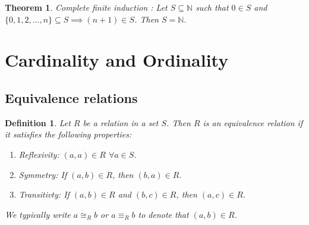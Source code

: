 \documentclass[a4paper]{article}
\newtheorem{mytheorem}{Theorem}
\newtheorem{mydef}{Definition}
\numberwithin{mytheorem}{section}
\numberwithin{mydef}{section}
\numberwithin{axiom}{section}
\numberwithin{example}{section}
\begin{document}
\begin{mytheorem} Complete finite induction : Let $S \subseteq \mathbb{N}$ such that $0 \in S$ and $\{0,1,2,...,n\} \subseteq S \implies (n+1) \in S$. Then $S = \mathbb{N}$.
\end{mytheorem}

\section{Cardinality and Ordinality}



\subsection{Equivalence relations}

\begin{mydef}Let $R$ be a relation in a set $S$. Then $R$ is an equivalence relation if it satisfies the following properties:
 \begin{enumerate}
 \item Reflexivity: $(a,a) \in R$ $\forall a \in S$. 
 \item Symmetry: If $(a,b) \in R$, then $(b,a) \in R$.
 \item Transitivty: If $(a,b) \in R$ and $(b,c) \in R$, then $(a,c) \in R$.
 \end{enumerate}
We typically write $a \cong_{R} b$ or $a \equiv_{R} b$ to denote that $(a,b) \in R$. 
\end{mydef}



\end{document}
